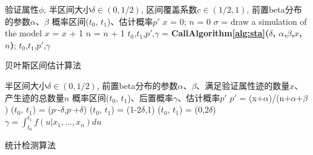 \begin{algorithm}
\begin{algorithmic}[1]
\REQUIRE 验证属性$\phi$, 半区间大小$\delta \in (0, 1/2)$, 区间覆盖系数$c \in (1/2, 1)$, 前置beta分布的参数$\alpha$、$\beta$
\ENSURE 概率区间($t_0$, $t_1$)、估计概率$p'$
\STATE $x$ = 0; $n$ = 0
\LOOP
        \STATE $\sigma$ = draw a simulation of the model\;
        \IF{$\sigma\models\phi$}
        \STATE $x$ = $x$ + 1
        \ENDIF
        \STATE $n$ = $n$ + 1
        \STATE $t_0$,$t_1$,$p'$,$\gamma$ = \textbf{CallAlgorithm\ref{alg:sta}($\delta$, $\alpha$,$\beta$,$x$, $n$)};
        \RETURN $t_0$,$t_1$,$p'$,$\gamma$
        \ENDIF
\ENDLOOP
\end{algorithmic}
\caption{贝叶斯区间估计算法}
\label{alg:bie}
\end{algorithm}


\begin{algorithm}[t]
\begin{algorithmic}[1]
\REQUIRE 半区间大小$\delta \in (0, 1/2)$, 前置beta分布的参数$\alpha$、$\beta$、满足验证属性迹的数量$x$、产生迹的总数量$n$
\ENSURE 概率区间($t_0$, $t_1$)、后置概率$\gamma$、估计概率$p'$
\STATE $p'$ = (x+$\alpha$)/(n+$\alpha$+$\beta$)
\STATE ($t_0$, $t_1$) = ($p^,$-$\delta$,$p^,$+$\delta$)
        \STATE ($t_0$, $t_1$) = (1-2$\delta$,1)
        \STATE ($t_0$, $t_1$) = (0,2$\delta$)
        \ENDIF
        \STATE $\gamma=\int_{t_0}^{t_1} {f(u|x_1,...,x_n)du}$
\end{algorithmic}
\caption{统计检测算法}
\label{alg:sta}
\end{algorithm}
